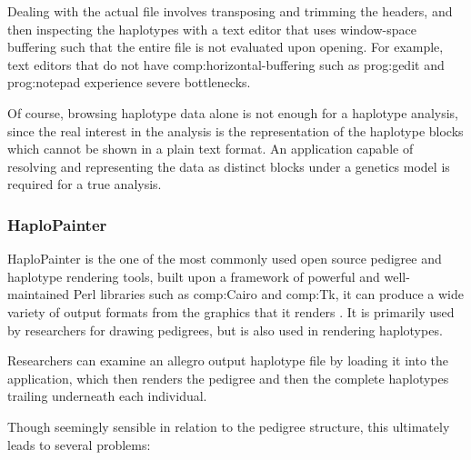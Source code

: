 Dealing with the actual file involves transposing and trimming the headers, and then inspecting the haplotypes with a text editor that uses window-space buffering such that the entire file is not evaluated upon opening. For example, text editors that do not have {\gls{comp:horizontal-buffering}} such as \gls{prog:gedit} and \gls{prog:notepad} experience severe bottlenecks. \enlargethispage{2\baselineskip}

Of course, browsing haplotype data alone is not enough for a haplotype analysis, since the real interest in the analysis is the representation of the haplotype blocks which cannot be shown in a plain text format. An application capable of resolving and representing the data as distinct blocks under a genetics model is required for a true analysis.


\subsubsection{HaploPainter}

HaploPainter is the one of the most commonly used open source pedigree and haplotype rendering tools, built upon a framework of powerful and well-maintained Perl libraries such as \gls{comp:Cairo} and \gls{comp:Tk}, it can produce a wide variety of output formats from the graphics that it renders \cite{haplopainter}. It is primarily used by researchers for drawing pedigrees, but is also used in rendering haplotypes.

Researchers can examine an allegro output haplotype file by loading it into the application, which then renders the pedigree and then the complete haplotypes trailing underneath each individual.

Though seemingly sensible in relation to the pedigree structure, this ultimately leads to several problems:

